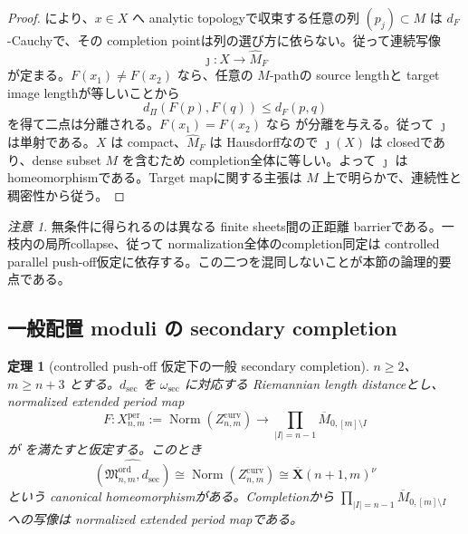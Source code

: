 \documentclass[11pt,a4paper]{ltjsarticle}
\newcommand{\Norm}{\operatorname{Norm}}
\newcommand{\ov}{\overline}
\newcommand{\Mord}{\mathfrak M^{\mathrm{ord}}}
\theoremstyle{plain}
\newtheorem{theorem}{定理}[section]
\theoremstyle{definition}
\theoremstyle{remark}
\newtheorem{remark}[remark]{注意}
\begin{document}
\begin{proof}
 により、$x\in X$ へ analytic topologyで収束する任意の列 $(p_j)\subset M$ は $d_F$-Cauchyで、その completion pointは列の選び方に依らない。従って連続写像
\[
 \jmath:X\longrightarrow\widehat M_F
\]
が定まる。$F(x_1)\ne F(x_2)$ なら、任意の $M$-pathの source lengthと target image lengthが等しいことから
\begin{equation}
\label{eq:general-product-lower}
 d_\Pi(F(p),F(q))\le d_F(p,q)
\end{equation}
を得て二点は分離される。$F(x_1)=F(x_2)$ なら  が分離を与える。従って $\jmath$ は単射である。$X$ は compact、$\widehat M_F$ は Hausdorffなので $\jmath(X)$ は closedであり、dense subset $M$ を含むため completion全体に等しい。よって $\jmath$ は homeomorphismである。Target mapに関する主張は $M$ 上で明らかで、連続性と稠密性から従う。
\end{proof}

\begin{remark}
無条件に得られるのは異なる finite sheets間の正距離 barrierである。一枝内の局所collapse、従って normalization全体のcompletion同定は controlled parallel push-off仮定に依存する。この二つを混同しないことが本節の論理的要点である。
\end{remark}

\subsection{一般配置 moduli の secondary completion}
\begin{theorem}[controlled push-off 仮定下の一般 secondary completion]
\label{thm:general-secondary-completion}
$n\ge2$、$m\ge n+3$ とする。$d_{\mathrm{sec}}$ を $\omega_{\mathrm{sec}}$ に対応する Riemannian length distanceとし、normalized extended period map
\[
 F:X_{n,m}^{\mathrm{per}}:=\Norm(Z_{n,m}^{\mathrm{curv}})
 \longrightarrow
 \prod_{|I|=n-1}\ov M_{0,[m]\setminus I}
\]
が  を満たすと仮定する。このとき
\begin{equation}
\label{eq:general-secondary-completion}
 \widehat{(\Mord_{n,m},d_{\mathrm{sec}})}
 \cong
 \Norm(Z_{n,m}^{\mathrm{curv}})
 \cong
 \ov{\mathbf X}(n+1,m)^\nu
\end{equation}
という canonical homeomorphismがある。Completionから
$\prod_{|I|=n-1}\ov M_{0,[m]\setminus I}$ への写像は normalized extended period mapである。
\end{theorem}
\end{document}
